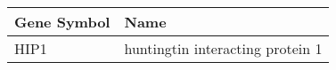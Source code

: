 \begin{tabular}{ll}
\toprule
Gene Symbol &                             Name \\
\midrule
       HIP1 & huntingtin interacting protein 1 \\
\bottomrule
\end{tabular}
